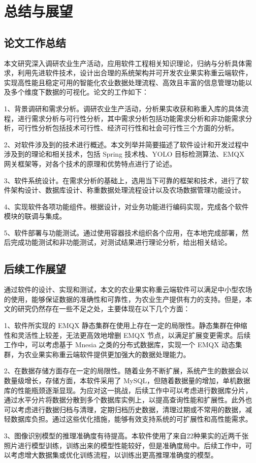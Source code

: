 \chapter{总结与展望}

\section{论文工作总结}

本文研究深入调研农业生产活动，应用软件工程相关知识理论，归纳与分析具体需求，利用先进软件技术，设计出合理的系统架构并可开发农业果实称重云端软件，实现高性能且稳定可用的智能化农业数据处理流程、高效且丰富的信息管理功能以及多个维度下数据的可视化。论文的工作如下：

1、背景调研和需求分析。调研农业生产活动，分析果实收获和称重入库的具体流程，进行需求分析与可行性分析，其中需求分析包括功能需求分析和非功能需求分析，可行性分析包括技术可行性、经济可行性和社会可行性三个方面的分析。

2、对软件涉及到的技术进行概述。本文列举并简要描述了软件设计和开发过程中涉及到的理论和相关技术，包括 Spring 技术栈、YOLO 目标检测算法、EMQX 网关框架等，对各个技术的原理和优势特点进行了论述。

3、软件系统设计。在需求分析的基础上，选用当下可靠的框架和技术，进行了软件架构设计、数据库设计、称重数据处理流程设计以及农场数据管理功能设计。

4、实现软件各项功能组件。根据设计，对业务功能进行编码实现，完成各个软件模块的联调与集成。

5、软件部署与功能测试。通过使用容器技术组织各个应用，在本地完成部署，然后完成功能测试和非功能测试，对测试结果进行理论分析，给出相关结论。

\section{后续工作展望}

通过软件的设计、实现和测试，本文的农业果实称重云端软件可以满足中小型农场的使用，能够保证数据的准确性和可靠性，为农业生产提供有力的支持。但是，本文的研究仍然存在一些不足之处，主要体现在以下几个方面：

1、软件所实现的 EMQX 静态集群在使用上存在一定的局限性。静态集群在伸缩性和灵活性上较差，无法更高效地增删 EMQX 节点，以满足扩展变更需求。后续工作中，可以考虑基于 Mnesia 之类的分布式数据库，实现一个 EMQX 动态集群，为农业果实称重云端软件提供更加强大的数据处理能力。

2、在数据存储方面存在一定的局限性。随着业务不断扩展，系统产生的数据会以数量级增长，存储方面，本软件采用了 MySQL，但随着数据量的增加，单机数据库的性能瓶颈逐渐显现。为应对这一挑战，后续工作中可以考虑进行数据库分片，通过水平分片将数据分散到多个数据库实例上，以提高查询性能和扩展性。此外也可以考虑进行数据归档与清理，定期归档历史数据，清理过期或不常用的数据，减轻数据库负担。通过这些优化措施，能够有效支持系统的可扩展性和高性能需求。

3、图像识别模型的推理准确度有待提高。本软件使用了来自22种果实的近两千张照片进行模型训练，训练出来的模型性能较好，但是准确度局中。后续工作中，可以考虑增大数据集或优化训练流程，以训练出更高推理准确度的模型。
